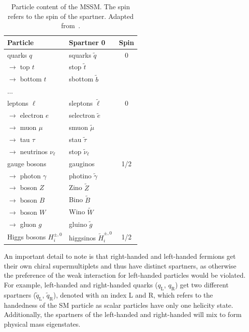 \begin{table}
	\centering
	\small
	\setlength\heavyrulewidth{0.2ex}
	\caption{Particle content of the MSSM. The spin refers to the spin of the spartner. Adapted from~\cite{Bustamante:2009us}.}
	\begin{tabular} {l l c}
		
		\toprule
		Particle & Spartner 0 & Spin \\ 
		\midrule 
		quarks $q$ & squarks $\tilde{q}$ & 0 \\
		$\rightarrow$ top $t$ & stop $\tilde{t}$ & \\
		$\rightarrow$ bottom $t$ & sbottom $\tilde{b}$ & \\
		$\dots$ & & \\
		leptons $\ell$ & sleptons $\tilde{\ell}$ & 0 \\
		$\rightarrow$ electron $e$ & selectron $\tilde{e}$ & \\
		$\rightarrow$ muon $\mu$ & smuon $\tilde{\mu}$ & \\
		$\rightarrow$ tau $\tau$ & stau $\tilde{\tau}$ & \\
		$\rightarrow$ neutrinos $\nu_\ell$ & stop $\tilde{\nu}_\ell$ & \\
		\midrule
		gauge bosons & gauginos & 1/2 \\
		$\rightarrow$ photon $\gamma$ & photino $\tilde{\gamma}$ & \\
		$\rightarrow$ boson $Z$ & Zino $\tilde{Z}$ & \\
		$\rightarrow$ boson $B$ & Bino $\tilde{B}$ & \\
		$\rightarrow$ boson $W$ & Wino $\tilde{W}$ & \\
		$\rightarrow$ gluon $g$ & gluino $\tilde{g}$ & \\
		\midrule
		Higgs bosons $H^{\pm,0}_i$ & higgsinos $\tilde{H}^{\pm,0}_i$ & 1/2 \\
		\bottomrule
	\end{tabular}\vspace{3mm}
	\label{tab:particles_MSSM}   
\end{table}

An important detail to note is that right-handed and left-handed fermions get their own chiral supermultiplets and thus have distinct spartners, as otherwise the preference of the weak interaction for left-handed particles would be violated. 
For example, left-handed and right-handed quarks ($q_\mathrm{L}$, $q_\mathrm{R}$) get two different spartners ($\tilde{q}_\mathrm{L}$, $\tilde{q}_\mathrm{R}$), denoted with an index L and R, which refers to the handedness of the SM particle as scalar particles have only one helicity state. Additionally, the spartners of the left-handed and right-handed will mix to form physical mass eigenstates.


